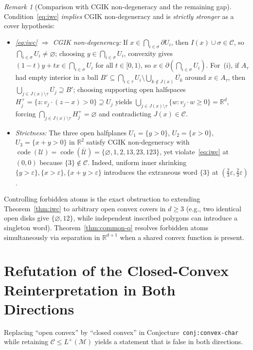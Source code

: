 \documentclass[11pt]{article}
\theoremstyle{plain}
\theoremstyle{definition}
\theoremstyle{remark}
\newtheorem{remark}{Remark}
\DeclareMathOperator{\code}{code}
\begin{document}
\begin{remark}[Comparison with CGIK non-degeneracy and the remaining gap]
Condition~\eqref{eq:iwc} \emph{implies} CGIK non-degeneracy and is \emph{strictly stronger} as a cover hypothesis:
\begin{itemize}[leftmargin=2em,itemsep=1pt,topsep=3pt]
\item \emph{\eqref{eq:iwc} $\Rightarrow$ CGIK non-degeneracy:} If $x \in \bigcap_{i \in \sigma} \partial U_i$, then $I(x) \cup \sigma \in \mathcal{C}$, so $\bigcap_{i \in \sigma} U_i \neq \varnothing$; choosing $y \in \bigcap_{i \in \sigma} U_i$, convexity gives $(1-t)y + tx \in \bigcap_{i \in \sigma} U_i$ for all $t \in [0, 1)$, so $x \in \partial(\bigcap_{i \in \sigma} U_i)$. For~(i), if $A_\tau$ had empty interior in a ball $B' \subseteq \bigcap_{i \in \tau} U_i \setminus \bigcup_{k \notin J(x)} \overline{U_k}$ around $x \in A_\tau$, then $\bigcup_{j \in J(x) \setminus \tau} \overline{U_j} \supseteq B'$; choosing supporting open halfspaces $H_j^+ = \{z : v_j \cdot (z - x) > 0\} \supseteq U_j$ yields $\bigcup_{j \in J(x) \setminus \tau} \{w : v_j \cdot w \ge 0\} = \mathbb{R}^d$, forcing $\bigcap_{j \in J(x) \setminus \tau} H_j^+ = \varnothing$ and contradicting $J(x) \in \mathcal{C}$.
\item \emph{Strictness:} The three open halfplanes $U_1 = \{y > 0\}$, $U_2 = \{x > 0\}$, $U_3 = \{x + y > 0\}$ in $\mathbb{R}^2$ satisfy CGIK non-degeneracy with $\code(\mathcal{U}) = \code(\overline{\mathcal{U}}) = \{\varnothing, 1, 2, 13, 23, 123\}$, yet violate~\eqref{eq:iwc} at $(0, 0)$ because $\{3\} \notin \mathcal{C}$. Indeed, uniform inner shrinking $\{y > \varepsilon\}, \{x > \varepsilon\}, \{x + y > \varepsilon\}$ introduces the extraneous word $\{3\}$ at $(\tfrac{2}{3}\varepsilon, \tfrac{2}{3}\varepsilon)$.
\end{itemize}
Controlling forbidden atoms is the exact obstruction to extending Theorem~\ref{thm:iwc} to arbitrary open convex covers in $d \ge 3$ (e.g., two identical open disks give $\{\varnothing, 12\}$, while independent inscribed polygons can introduce a singleton word). Theorem~\ref{thm:common-q} resolves forbidden atoms simultaneously via separation in $\mathbb{R}^{d+1}$ when a shared convex function is present.
\end{remark}

\section{Refutation of the Closed-Convex Reinterpretation in Both Directions}

Replacing ``open convex'' by ``closed convex'' in Conjecture~\texttt{conj:convex-char} while retaining $\mathcal{C} \le L^+(\mathcal{M})$ yields a statement that is false in both directions.
\end{document}
